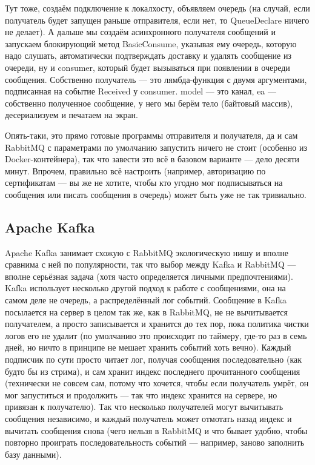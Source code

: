 \documentclass[a5paper]{article}
\begin{document}
Тут тоже, создаём подключение к локалхосту, объявляем очередь (на случай, если получатель будет запущен раньше отправителя, если нет, то QueueDeclare ничего не делает). А дальше мы создаём асинхронного получателя сообщений и запускаем блокирующий метод BasicConsume, указывая ему очередь, которую надо слушать, автоматически подтверждать доставку и удалять сообщение из очереди, ну и consumer, который будет вызываться при появлении в очереди сообщения. Собственно получатель --- это лямбда-функция с двумя аргументами, подписанная на событие Received у consumer. model --- это канал, ea --- собственно полученное сообщение, у него мы берём тело (байтовый массив), десериализуем и печатаем на экран.

Опять-таки, это прямо готовые программы отправителя и получателя, да и сам RabbitMQ с параметрами по умолчанию запустить ничего не стоит (особенно из Docker-контейнера), так что завести это всё в базовом варианте --- дело десяти минут. Впрочем, правильно всё настроить (например, авторизацию по сертификатам --- вы же не хотите, чтобы кто угодно мог подписываться на сообщения или писать сообщения в очередь) может быть уже не так тривиально.

\subsection{Apache Kafka}

Apache Kafka занимает схожую с RabbitMQ экологическую нишу и вполне сравнима с ней по популярности, так что выбор между Kafka и RabbitMQ --- вполне серьёзная задача (хотя часто определяется личными предпочтениями). Kafka использует несколько другой подход к работе с сообщениями, она на самом деле не очередь, а распределённый лог событий. Сообщение в Kafka посылается на сервер в целом так же, как в RabbitMQ, не не вычитывается получателем, а просто записывается и хранится до тех пор, пока политика чистки логов его не удалит (по умолчанию это происходит по таймеру, где-то раз в семь дней, но ничто в принципе не мешает хранить событий хоть вечно). Каждый подписчик по сути просто читает лог, получая сообщения последовательно (как будто бы из стрима), и сам хранит индекс последнего прочитанного сообщения (технически не совсем сам, потому что хочется, чтобы если получатель умрёт, он мог запуститься и продолжить --- так что индекс хранится на сервере, но привязан к получателю). Так что несколько получателей могут вычитывать сообщения независимо, и каждый получатель может отмотать назад индекс и вычитать сообщения снова (чего нельзя в RabbitMQ и что бывает удобно, чтобы повторно проиграть последовательность событий --- например, заново заполнить базу данными).
\end{document}
